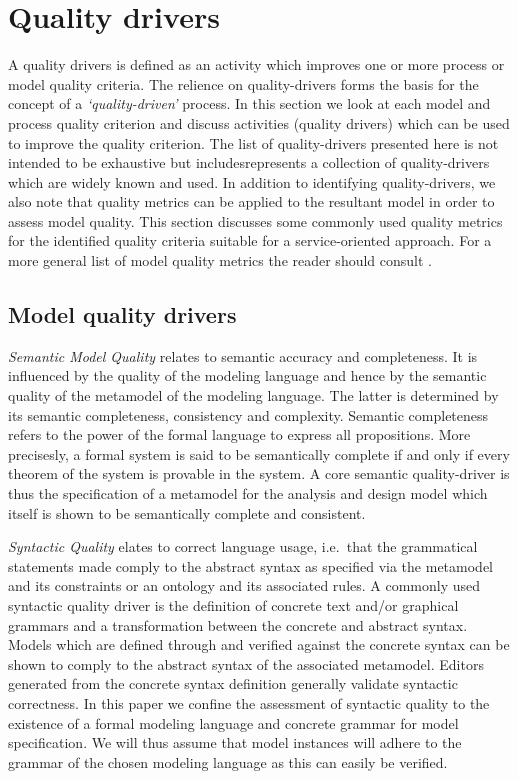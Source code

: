 \section{Quality drivers}
\label{sec:qualityDrivers}

A quality drivers is defined as an activity which improves one or more process or model quality criteria\cite{petersen_software_1989}. The relience on quality-drivers forms the basis for the concept of a \emph{`quality-driven'} process. In this section we look at each model and process quality criterion and discuss activities (quality drivers) which can be used to improve the quality criterion. The list of quality-drivers presented here is not intended to be exhaustive but includesrepresents a collection of quality-drivers which are widely known and used. In addition to identifying quality-drivers, we also note that quality metrics can be applied to the resultant model in order to assess model quality. This section discusses some commonly used quality metrics for the identified quality criteria suitable for a service-oriented approach. For a more general list of model quality metrics the reader should consult \cite{mohagheghi_existing_2009}.

\subsection{Model quality drivers}

\emph{Semantic Model Quality} relates to semantic accuracy and completeness. It is influenced by the quality of the modeling language and hence by the semantic quality of the metamodel of the modeling language. The latter is determined by its semantic completeness, consistency and complexity\cite{buder_effects_2010}. Semantic completeness refers to the power of the formal language to express all propositions. More precisesly, a formal system is said to be semantically complete if and only if every theorem of the system is provable in the system.  A core semantic quality-driver is thus the specification of a metamodel for the analysis and design model which itself is shown to be semantically complete and consistent.

\emph{Syntactic Quality} elates to correct language usage\cite{lange_christiaan_assessing_2007}, i.e.\ that the grammatical statements made comply to the abstract syntax as specified via the metamodel and its constraints or an ontology and its associated rules. A commonly used syntactic quality driver is the definition of concrete text and/or graphical grammars and a transformation between the concrete and abstract syntax. Models which are defined through and verified against the concrete syntax can be shown to comply to the abstract syntax of the associated metamodel. Editors generated from the concrete syntax definition generally validate syntactic correctness. In this paper we confine the assessment of syntactic quality to the existence of a formal modeling language and concrete grammar for model specification. We will thus assume that model instances will adhere to the grammar of the chosen modeling language as this can easily be verified.

